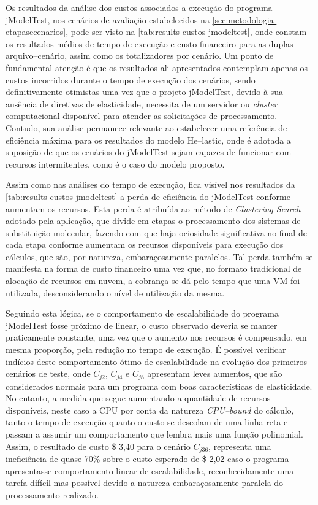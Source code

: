 \documentclass[english,brazilian]{UNISINOSmonografia} %
\begin{document}
Os resultados da análise dos custos associados a execução do programa jModelTest, nos cenários de avaliação estabelecidos na \autoref{sec:metodologia-etapasecenarios}, pode ser visto na \autoref{tab:results-custos-jmodeltest}, onde constam os resultados médios de tempo de execução e custo financeiro para as duplas arquivo--cenário, assim como os totalizadores por cenário.
%
Um ponto de fundamental atenção é que os resultados ali apresentados contemplam apenas os custos incorridos durante o tempo de execução dos cenários, sendo definitivamente otimistas uma vez que o projeto jModelTest, devido à sua ausência de diretivas de elasticidade, necessita de um servidor ou \textit{cluster} computacional disponível para atender as solicitações de processamento.
%
Contudo, sua análise permanece relevante ao estabelecer uma referência de eficiência máxima para os resultados do modelo \textsf{He}--lastic, onde é adotada a suposição de que os cenários do jModelTest sejam capazes de funcionar com recursos intermitentes, como é o caso do modelo proposto.


Assim como nas análises do tempo de execução, fica visível nos resultados da  \autoref{tab:results-custos-jmodeltest} a perda de eficiência do jModelTest conforme aumentam os recursos.
%
Esta perda é atribuída ao método de \textit{Clustering Search} adotado pela aplicação, que divide em etapas o processamento dos sistemas de substituição molecular, fazendo com que haja ociosidade significativa no final de cada etapa conforme aumentam os recursos disponíveis para execução dos cálculos, que são, por natureza, embaraçosamente paralelos.
%
Tal perda também se manifesta na forma de custo financeiro uma vez que, no formato tradicional de alocação de recursos em nuvem, a cobrança se dá pelo tempo que uma VM foi utilizada, desconsiderando o nível de utilização da mesma.



Seguindo esta lógica, se o comportamento de escalabilidade do programa jModelTest fosse próximo de linear, o custo observado deveria se manter praticamente constante, uma vez que o aumento nos recursos é compensado, em mesma proporção, pela redução no tempo de execução.
%
É possível verificar indícios deste comportamento ótimo de escalabilidade na evolução dos primeiros cenários de teste, onde $C_{j2}$, $C_{j4}$ e $C_{j8}$ apresentam leves aumentos, que são considerados normais para um programa com boas características de elasticidade.
%
No entanto, a medida que segue aumentando a quantidade de recursos disponíveis, neste caso a CPU por conta da natureza \textit{CPU--bound} do cálculo, tanto o tempo de execução quanto o custo se descolam de uma linha reta e passam a assumir um comportamento que lembra mais uma função polinomial.
%
Assim, o resultado de custo \$ 3,40 para o cenário $C_{j36}$, representa uma ineficiência de quase 70\% sobre o custo esperado de \$ 2,02 caso o programa apresentasse comportamento linear de escalabilidade, reconhecidamente uma tarefa difícil mas possível devido a natureza embaraçosamente paralela do processamento realizado.
\end{document}
